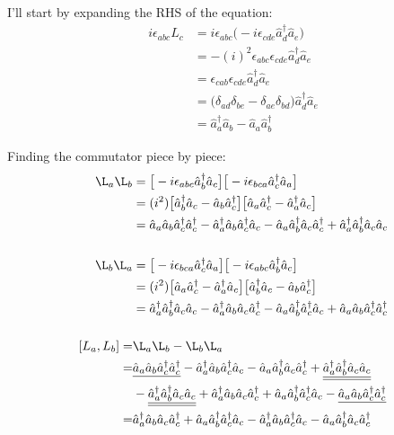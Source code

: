 \documentclass{article}
\renewcommand{\RAISE}[0]{\hat{a}^{\dagger}}
\renewcommand{\LOWER}[0]{\hat{a}}
\def\uunderline#1{\underline{\underline{#1}}}
\begin{document}
I'll start by expanding the RHS of the equation:
\begin{align*}
    i \epsilon_{abc} L_c
    &= i \epsilon_{abc} \big( -i \epsilon_{cde} \RAISE_d \LOWER_e \big) \\
    &= -(i)^2 \epsilon_{abc} \epsilon_{cde} \RAISE_d \LOWER_e \\
    &= \epsilon_{cab} \epsilon_{cde} \RAISE_d \LOWER_e \\
    &= \big( \delta_{ad} \delta_{be} - \delta_{ae} \delta_{bd} \big) \RAISE_d \LOWER_e \\
    &= \RAISE_a \LOWER_b - \LOWER_a \RAISE_b
\end{align*}

Finding the commutator piece by piece:
\begin{align*}
    \L_a \L_b
    &= \big[ -i \epsilon_{abc}\RAISE_b\LOWER_c \big] \big[ -i \epsilon_{bca} \RAISE_c\LOWER_a \big] \\
    &= (i^2) \big[ \RAISE_b\LOWER_c - \LOWER_b\RAISE_c \big] \big[ \LOWER_a\RAISE_c - \RAISE_a\LOWER_c \big] \\
    &= \LOWER_a\LOWER_b\RAISE_c\RAISE_c - \RAISE_a\LOWER_b\RAISE_c\LOWER_c
        - \LOWER_a\RAISE_b\LOWER_c\RAISE_c + \RAISE_a\RAISE_b\LOWER_c\LOWER_c \\
        \text{  } \\
    \L_b \L_a
    &= \big[ -i \epsilon_{bca} \RAISE_c\LOWER_a \big] \big[ -i \epsilon_{abc}\RAISE_b\LOWER_c \big] \\
    &= (i^2) \big[ \LOWER_a\RAISE_c - \RAISE_a\LOWER_c \big] \big[ \RAISE_b\LOWER_c - \LOWER_b\RAISE_c \big] \\
    &= \RAISE_a\RAISE_b\LOWER_c\LOWER_c - \RAISE_a\LOWER_b\LOWER_c\RAISE_c -
        \LOWER_a\RAISE_b\RAISE_c\LOWER_c + \LOWER_a\LOWER_b\RAISE_c\RAISE_c \\
    \text{ } \\
    [L_a, L_b]
    =& \L_a \L_b - \L_b \L_a \\
    =& \underline{\LOWER_a\LOWER_b\RAISE_c\RAISE_c} - \RAISE_a\LOWER_b\RAISE_c\LOWER_c
        - \LOWER_a\RAISE_b\LOWER_c\RAISE_c + \uunderline{\RAISE_a\RAISE_b\LOWER_c\LOWER_c} \\
        &- \uunderline{\RAISE_a\RAISE_b\LOWER_c\LOWER_c} + \RAISE_a\LOWER_b\LOWER_c\RAISE_c
        + \LOWER_a\RAISE_b\RAISE_c\LOWER_c - \underline{\LOWER_a\LOWER_b\RAISE_c\RAISE_c} \\
    =& \RAISE_a\LOWER_b\LOWER_c\RAISE_c + \LOWER_a\RAISE_b\RAISE_c\LOWER_c
        - \RAISE_a\LOWER_b\RAISE_c\LOWER_c - \LOWER_a\RAISE_b\LOWER_c\RAISE_c \\

\end{align*}
\end{document}
